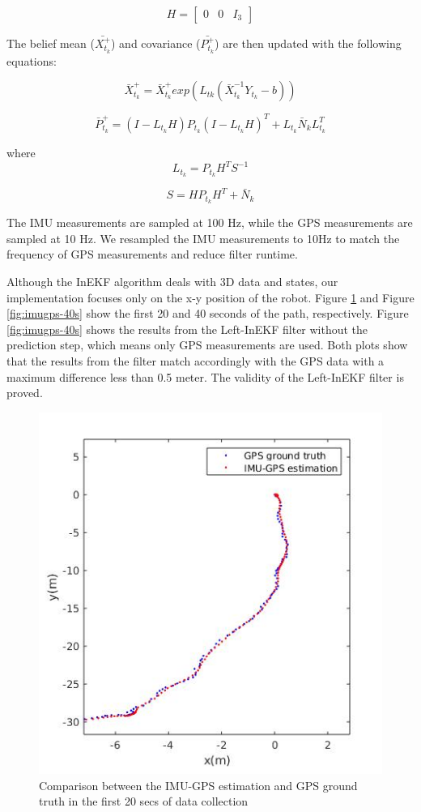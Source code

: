\begin{equation}
H = 
    \begin{bmatrix}
    0 & 0 & I_{3}
    \end{bmatrix}
\end{equation}

The belief mean ($\bar{X_{t_{k}}^+}$) and covariance ($\bar{P_{t_{k}}^+}$) are then updated with the following equations: 

\begin{equation}
\bar{X}_{t_{k}}^+ = \bar{X}_{t_{k}}^+ 
exp(L_{tk} (\bar{X}_{t_{k}}^{-1}Y_{t_k}-b) )
\end{equation}

\begin{equation}
\bar{P}_{t_{k}}^+ = (I - L_{t_k} H )P_{t_k}(I - L_{t_k} H )^T
+L_{t_k}\bar{N}_{k}L_{t_k}^T
\end{equation}

where 
\begin{equation}
L_{t_k} = P_{t_{k}} H^T S^{-1}
\end{equation}

\begin{equation}
S = HP_{t_k} H^T + \bar{N}_{k}
\end{equation}

The IMU measurements are sampled at 100 Hz, while the GPS measurements are sampled at 10 Hz. We resampled the IMU measurements to 10Hz to match the frequency of GPS measurements and reduce filter runtime.

Although the InEKF algorithm deals with 3D data and states, our implementation focuses only on the x-y position of the robot. Figure \ref{fig:imugps-20s} and Figure \ref{fig:imugps-40s} show the first 20 and 40 seconds of the path, respectively. Figure \ref{fig:imugps-40s} shows the results from the Left-InEKF filter without the prediction step, which means only GPS measurements are used. Both plots show that the results from the filter match accordingly with the GPS data with a maximum difference less than 0.5 meter. The validity of the Left-InEKF filter is proved.

\begin{figure}[hbt!]
    \centering
    \includegraphics[width = 0.5\linewidth]{media/Starting_results.jpg}
    \caption{Comparison between the IMU-GPS estimation and GPS ground truth in the first 20 secs of data collection}
    \label{fig:imugps-20s}
\end{figure}

